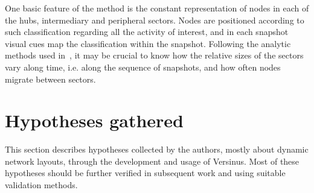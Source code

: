 \documentclass[runningheads]{llncs}
\begin{document}
One basic feature of the method is the constant representation of
nodes in each of the hubs, intermediary and peripheral sectors.
Nodes are positioned according to such classification regarding all
the activity of interest, and in each snapshot visual cues map the
classification within the snapshot.
Following the analytic methods used in~\cite{stab}, it may be crucial
to know how the relative sizes of the sectors vary along time, i.e. along
the sequence of snapshots, and how often nodes migrate between sectors.

\section{Hypotheses gathered}\label{sec:ins}
This section describes hypotheses collected by the authors, mostly about dynamic network layouts, through the development and usage of Versinus.
Most of these hypotheses should be further verified in subsequent work and using
suitable validation methods.
\end{document}
